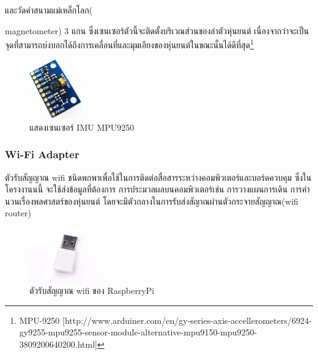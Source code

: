 และวัดค่าสนามแม่เหล็กโลก({magnetometer) 3 แกน ซึ่งเซนเซอร์ตัวนี้จะติดตั้งบริเวณส่วนของลำตัวหุ่นยนต์
เนื่องจากว่าจะเป็นจุดที่สามารถบ่งบอกได้ถึงการเคลื่อนที่และมุมเอียงของหุ่นยนต์ในขณะนั้นได้ดีที่สุด\footnote{ MPU-9250 [http://www.arduiner.com/en/gy-series-axis-accellerometers/6924-gy9255-mpu9255-sensor-module-alternative-mpu9150-mpu9250-3809200640200.html] }
\begin{figure}[h!]
    \centering
    \includegraphics[width=0.2\textwidth]{chapter3/images/mpu9250.jpeg}
    \caption{แสดงเซนเซอร์ IMU MPU9250}
    \label{fig:mpu9250}
\end{figure}

\subsubsection*{Wi-Fi Adapter}
ตัวรับสัญญาณ wifi ชนิดพกพาเพื่อใช้ในการติดต่อสื่อสารระหว่างคอมพิวเตอร์และบอร์ดควบคุม ซึ่งในโครงงานนนี้
จะใช้ส่งข้อมูลที่ต้องการ การประมวลผลบนคอมพิวเตอร์เช่น การวางแผนการเดิน การคำนวนเรื่องพลศาสตร์ของหุ่นยนต์
โดยจะมีตัวกลางในการรับส่งสัญาณผ่านตัวกระจายสัญญาณ(wifi router) 
\begin{figure}[h!]
    \centering
    \includegraphics[width=0.3\textwidth]{chapter3/images/rpi_wifi_adaptor.jpg}
    \caption{ตัวรับสัญญาณ wifi ของ RaspberryPi}
    \label{fig:rpi_wifi_adaptor}
\end{figure}

\clearpage
}
